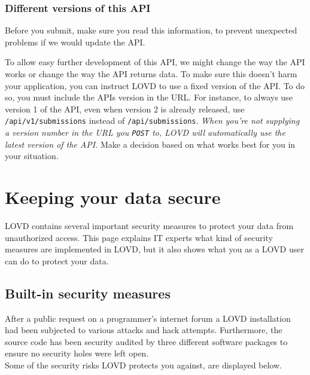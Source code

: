 \subsection{Different versions of this API}
\label{ssec:different_versions_of_submission_api}
\begin{warntable}
Before you submit, make sure you read this information, to prevent unexpected problems if we would update the API.
\end{warntable}

To allow easy further development of this API,
 we might change the way the API works or change the way the API returns data.
To make sure this doesn't harm your application, you can instruct LOVD to use a fixed version of the API.
To do so, you must include the APIs version in the URL.
For instance, to always use version 1 of the API, even when version 2 is already released, use
 \texttt{/api/v1/submissions} instead of \texttt{/api/submissions}.
\emph{When you're not supplying a version number in the URL you \texttt{POST} to,
 LOVD will automatically use the latest version of the API.}
Make a decision based on what works best for you in your situation.










\hypertarget{chap:security}{}
\chapter{Keeping your data secure}
LOVD contains several important security measures to protect your data from unauthorized access.
This page explains IT experts what kind of security measures are implemented in LOVD, but it also shows what you as a LOVD user can do to protect your data.





\section{Built-in security measures}
After a public request on a programmer's internet forum a LOVD installation had been subjected to various attacks and hack attempts.
Furthermore, the source code has been security audited by three different software packages to ensure no security holes were left open.\\
Some of the security risks LOVD protects you against, are displayed below.




